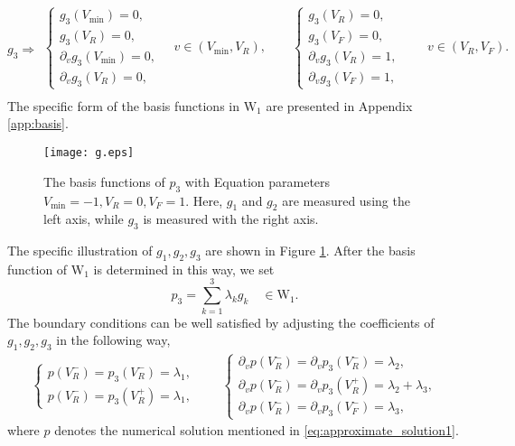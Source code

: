 \begin{equation}
    g_3\Rightarrow
    \begin{gathered}
    \begin{cases}
            g_3(V_{\min})=0,\\
            g_3(V_R)=0,\\
            \partial_v g_3(V_{\min})=0,\\
            \partial_v g_3(V_R)=0,
        \end{cases}\quad v\in(V_{\min},V_R), \qquad
    \begin{cases}
        g_3(V_R)=0,\\
        g_3(V_F)=0,\\
        \partial_v g_3(V_R)=1,\\
        \partial_v g_3(V_F)=1,
    \end{cases}\qquad v\in(V_R,V_F).\\
    \end{gathered}
\end{equation}
 The specific form of the basis functions in $\mathrm{W}_1$ are presented in Appendix \ref{app:basis}.

\begin{figure}[!htb]
    \centering
        \begin{minipage}[c]{0.8\textwidth}
            \centering
            \texttt{[image: g.eps]}
        \end{minipage}
         \caption{The basis functions of $p_3$ with Equation parameters $V_{\min}=-1,V_R=0,V_F=1$. Here, $g_1$ and $g_2$ are measured using the left axis, while $g_3$ is measured with the right axis.}
        \label{fig:g}
\end{figure}
The specific illustration of $g_1,g_2,g_3$ are shown in Figure \ref{fig:g}. After the basis function of $\mathrm{W}_1$ is determined in this way, we set
\begin{equation}
    \label{eq:w1_expansion}
    p_3=\sum_{k=1}^3 \lambda_kg_k \quad \in \mathrm{W}_1.
\end{equation}
The boundary conditions can be well satisfied by adjusting the coefficients of $g_1,g_2,g_3$ in the following way,
\begin{equation}
    \label{eq:lambda}
    \begin{gathered}
        \begin{cases}
            p(V_R^-)=p_3(V_R^-)=\lambda_1,\\
            p(V_R^-)=p_3(V_R^+)=\lambda_1,
        \end{cases}\qquad
        \begin{cases}
            \partial_vp(V_R^-)=\partial_vp_3(V_R^-)=\lambda_2,\\
            \partial_vp(V_R^-)=\partial_vp_3(V_R^+)=\lambda_2+\lambda_3,\\
            \partial_vp(V_R^-)=\partial_vp_3(V_F^-)=\lambda_3,
        \end{cases}
    \end{gathered}
\end{equation}
where $p$ denotes the numerical solution mentioned in \eqref{eq:approximate_solution1}. 

